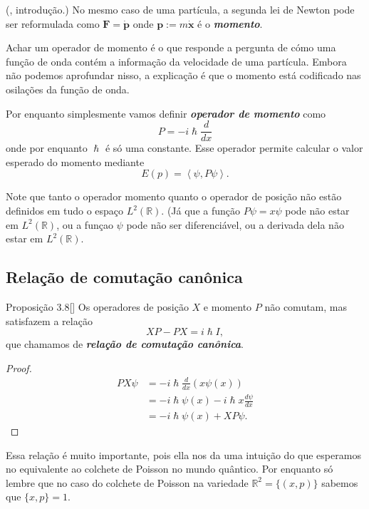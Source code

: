 (\cite{clas}, introdução.) No mesmo caso de uma partícula, a segunda lei de Newton pode ser reformulada como  $\mathbf{F}=\dot{\mathbf{p}}$ onde $\mathbf{p}:=m\dot{\mathbf{x}}$ é o \textit{\textbf{momento}}.

Achar um operador de momento é o que responde a pergunta de cómo uma função de onda contém a informação da velocidade de uma partícula. Embora não podemos aprofundar nisso, a explicação é que o momento está codificado nas osilações da função de onda.

Por enquanto simplesmente vamos definir \textit{\textbf{operador de momento}} como
\[P=-i\hslash\frac{d}{dx}\]
 onde por enquanto $\hslash$ é só uma constante. Esse operador permite calcular o valor esperado do momento mediante
 \[E(p)=\left<\psi,P\psi\right>.\]

\begin{remark}\leavevmode
	Note que tanto o operador momento quanto o operador de posição não estão definidos em tudo o espaço $L^2(\mathbb{R})$. (Já que a função $P\psi=x\psi$ pode não estar em $L^2(\mathbb{R})$, ou a funçao $\psi$ pode não ser diferenciável, ou a derivada dela não estar em $L^2(\mathbb{R})$.
\end{remark}

\subsection{Relação de comutação canônica}

\begin{thing4}{Proposição 3.8}[\cite{hallq}]\leavevmode
Os operadores de posição  $X$ e momento $P$ não comutam, mas satisfazem a relação
\[XP-PX=i\hslash I,\]que chamamos de \textit{\textbf{relação de comutação canônica}}.
\end{thing4}

\begin{proof}\leavevmode
	\begin{align*}
		PX\psi&=-i\hslash\frac{d}{dx}(x\psi(x))\\
		&=-i\hslash\psi(x)-i\hslash x\frac{d\psi}{dx}\\
		&=-i\hslash\psi(x)+XP\psi.
	\end{align*}
\end{proof}
Essa relação é muito importante, pois ella nos da uma intuição do que esperamos no equivalente ao colchete de Poisson no mundo quântico. Por enquanto só lembre que no caso do colchete de Poisson na variedade $\mathbb{R}^{2}=\{(x,p)\}$ sabemos que $\{x,p\} =1$.

